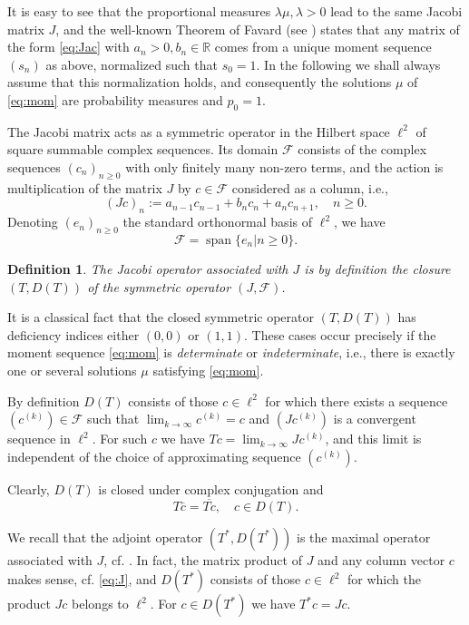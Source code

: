 \documentclass [12pt]{article}
\DeclareMathOperator{\spn}{span}
\newtheorem{defn}[thm]{Definition}
\newcommand{\R}{\mathbb{R}}
\newcommand{\la}{\lambda}
\begin{document}
 It is easy to see that the proportional measures $\la\mu, \la>0$ lead to the same Jacobi matrix $J$, and the well-known Theorem of Favard (see \cite[Theorem 5.14]{Sch}) states that any matrix of the form \eqref{eq:Jac} with $a_n>0, b_n\in\R$ comes from a unique  moment sequence  $(s_n)$ as above, normalized such that $s_0=1$. In the following we shall always assume that this normalization holds, and consequently the solutions $\mu$ of \eqref{eq:mom} are probability measures  and $p_0=1$.

The Jacobi matrix acts as a symmetric operator  in the Hilbert space $\ell^2$ of square summable complex sequences. Its domain $\mathcal F$ consists of the complex sequences $(c_n)_{n\ge 0}$ with only finitely many non-zero terms, and the action is multiplication of the matrix $J$ by $c\in\mathcal F$ considered as a column, i.e.,
\begin{equation}\label{eq:J} 
(Jc)_n:=a_{n-1}c_{n-1}+b_n c_n+a_n c_{n+1},\quad n\ge 0.
\end{equation}
Denoting $(e_n)_{n\ge 0}$ the standard orthonormal basis of $\ell^2$, we have
\begin{equation*}\label{eq:F}
\mathcal F=\spn \{e_n|n\ge 0\}.
\end{equation*}

\begin{defn} The Jacobi operator associated with $J$ is by definition the closure $(T,D(T))$ of the symmetric operator $(J,\mathcal F)$.
\end{defn}

It is a classical fact that the closed symmetric operator $(T,D(T))$ has deficiency indices  either $(0,0)$  or $(1,1)$. These cases occur precisely if the  moment sequence \eqref{eq:mom} is {\it determinate} or {\it indeterminate}, i.e., there is exactly one or several solutions $\mu$ satisfying \eqref{eq:mom}.   

 By definition $D(T)$ consists of those $c\in\ell^2$ for which there exists a sequence
 $(c^{(k)})\in\mathcal F$ such that $\lim_{k\to\infty}c^{(k)}=c$ and $(Jc^{(k)})$ is a convergent sequence in $\ell^2$. For  such $c$ we have $Tc=\lim_{k\to\infty} Jc^{(k)}$, and this limit is independent of the choice of approximating sequence $(c^{(k)})$. 
 
 Clearly, $D(T)$ is closed under complex conjugation and 
 $$
 T\overline{c}=\overline{Tc},\quad c\in D(T).
 $$
 
 We recall that the adjoint operator $(T^*,D(T^*))$ is the maximal operator associated with $J$, cf. \cite[Proposition 6.5]{Sch}. In fact, the matrix product of $J$  and any column vector $c$ makes sense, cf. \eqref{eq:J}, and $D(T^*)$ consists of those $c\in\ell^2$ for which the product $Jc$ belongs to $\ell^2$. For $c\in D(T^*)$ we have $T^*c=Jc$.
 
\end{document}
